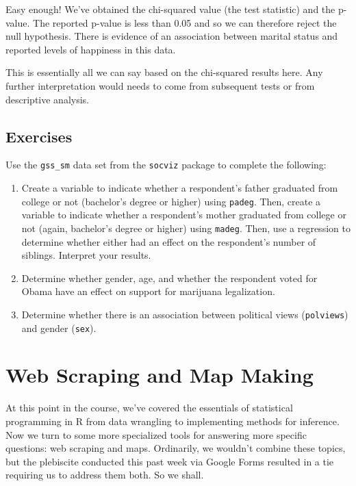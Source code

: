 \documentclass[
  letterpaper,
]{book}
\begin{document}
Easy enough! We've obtained the chi-squared value (the test statistic)
and the p-value. The reported p-value is less than 0.05 and so we can
therefore reject the null hypothesis. There is evidence of an
association between marital status and reported levels of happiness in
this data.

This is essentially all we can say based on the chi-squared results
here. Any further interpretation would needs to come from subsequent
tests or from descriptive analysis.

\hypertarget{exercises-2}{%
\section{Exercises}\label{exercises-2}}

Use the \texttt{gss\_sm} data set from the \texttt{socviz} package to
complete the following:

\begin{enumerate}
\def\labelenumi{\arabic{enumi}.}
\item
  Create a variable to indicate whether a respondent's father graduated
  from college or not (bachelor's degree or higher) using
  \texttt{padeg}. Then, create a variable to indicate whether a
  respondent's mother graduated from college or not (again, bachelor's
  degree or higher) using \texttt{madeg}. Then, use a regression to
  determine whether either had an effect on the respondent's number of
  siblings. Interpret your results.
\item
  Determine whether gender, age, and whether the respondent voted for
  Obama have an effect on support for marijuana legalization.
\item
  Determine whether there is an association between political views
  (\texttt{polviews}) and gender (\texttt{sex}).
\end{enumerate}


\hypertarget{web-scraping-and-map-making}{%
\chapter{Web Scraping and Map
Making}\label{web-scraping-and-map-making}}

At this point in the course, we've covered the essentials of statistical
programming in R from data wrangling to implementing methods for
inference. Now we turn to some more specialized tools for answering more
specific questions: web scraping and maps. Ordinarily, we wouldn't
combine these topics, but the plebiscite conducted this past week via
Google Forms resulted in a tie requiring us to address them both. So we
shall.
\end{document}
